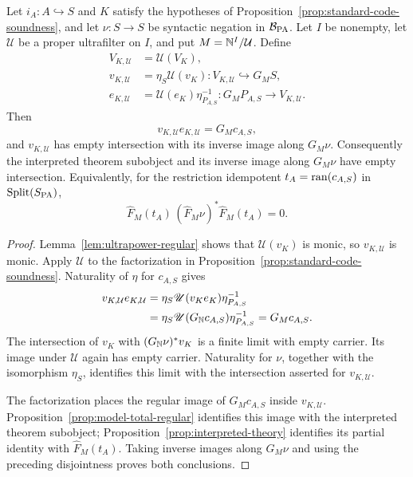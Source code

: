 \begin{theorem}
\label{thm:ultrapower-soundness}
Let $i_A:A\hookrightarrow S$ and $K$ satisfy the hypotheses of
Proposition~\ref{prop:standard-code-soundness}, and let
$\nu:S\to S$ be syntactic negation in $\mathcal B_{\mathrm{PA}}$.
Let $I$ be nonempty,
let $\mathcal U$ be a proper ultrafilter on $I$, and put
$M=\mathbb N^I/\mathcal U$. Define
\[
 \begin{aligned}
 V_{K,\mathcal U}&=\mathscr U(V_K),\\
 v_{K,\mathcal U}
   &=\eta_S\mathscr U(v_K):V_{K,\mathcal U}\hookrightarrow G_MS,\\
 e_{K,\mathcal U}
   &=\mathscr U(e_K)\eta_{P_{A,S}}^{-1}:
       G_MP_{A,S}\longrightarrow V_{K,\mathcal U}.
 \end{aligned}
\]
Then
\begin{equation}\label{eq:ultrapower-soundness-factorization}
 v_{K,\mathcal U}e_{K,\mathcal U}=G_Mc_{A,S},
\end{equation}
and $v_{K,\mathcal U}$ has empty intersection with its inverse
image along $G_M\nu$. Consequently the interpreted theorem
subobject and its inverse image along $G_M\nu$ have empty
intersection. Equivalently, for the restriction idempotent
$t_A=\operatorname{ran}(c_{A,S})$ in $\operatorname{Split}(S_{\mathrm{PA}})$,
\[
 \widehat F_M(t_A)\,
       (\widehat F_M\nu)^*\widehat F_M(t_A)=0.
\]
\end{theorem}
\begin{proof}
Lemma~\ref{lem:ultrapower-regular} shows that
$\mathscr U(v_K)$ is monic, so $v_{K,\mathcal U}$ is monic.
Apply $\mathscr U$ to the factorization in
Proposition~\ref{prop:standard-code-soundness}. Naturality of
$\eta$ for $c_{A,S}$ gives
\[
 \begin{aligned}
 v_{K,\mathcal U}e_{K,\mathcal U}
 &=\eta_S\mathscr U(v_Ke_K)\eta_{P_{A,S}}^{-1}\\
 &=\eta_S\mathscr U(G_{\mathbb N}c_{A,S})
                          \eta_{P_{A,S}}^{-1}
   =G_Mc_{A,S}.
 \end{aligned}
\]
The intersection of $v_K$ with $(G_{\mathbb N}\nu)^*v_K$ is a
finite limit with empty carrier. Its image under $\mathscr U$
again has empty carrier. Naturality for $\nu$, together with
the isomorphism $\eta_S$, identifies this limit with the
intersection asserted for $v_{K,\mathcal U}$.

The factorization places the regular image of $G_Mc_{A,S}$
inside $v_{K,\mathcal U}$. Proposition~\ref{prop:model-total-regular}
identifies this image with the interpreted theorem subobject;
Proposition~\ref{prop:interpreted-theory} identifies its partial
identity with $\widehat F_M(t_A)$. Taking inverse images along
$G_M\nu$ and using the preceding disjointness proves both
conclusions.
\end{proof}

